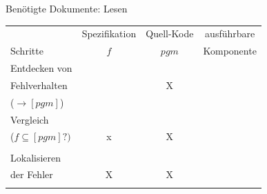\newpage
\centerline{Ben\"otigte Dokumente: Lesen}
\bigskip

\begin{center}
\begin{tabular}{|l||c|c|c|}
\hline
               & Spezifikation & Quell-Kode  & ausf\"uhrbare\\
Schritte       &     $f$       & $pgm$       & Komponente\\
\hline
\hline
Entdecken von  &             &             &      \\
Fehlverhalten  &               &      X      &      \\
($\rightarrow [pgm]$) &        &             &      \\
\hline
Vergleich      &               &             &      \\
($f\subseteq [pgm]?)$&   x     &      X      &      \\
               &               &             &      \\
\hline
Lokalisieren   &             &             &      \\
der Fehler     &      X        &      X      &      \\
               &               &             &      \\
\hline
\end{tabular}
\end{center}
